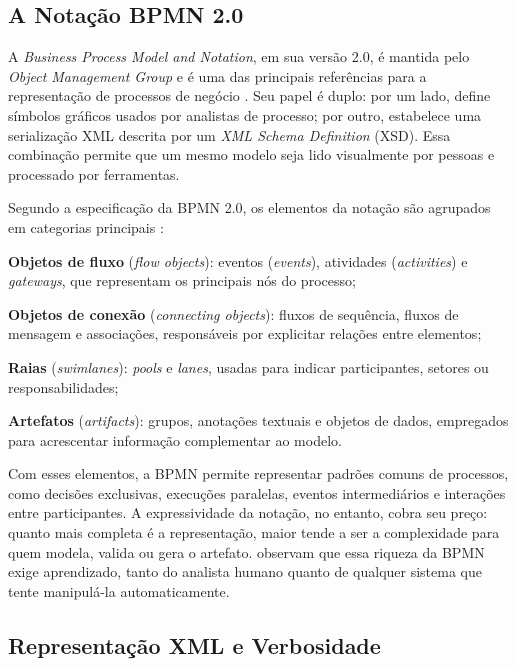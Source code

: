 \subsection{A Notação BPMN 2.0}
\label{subsec:bpmn-notacao}

A \textit{Business Process Model and Notation}, em sua versão 2.0, é mantida pelo \textit{Object Management Group} e é uma das principais referências para a representação de processos de negócio \cite{omg2011bpmn}. Seu papel é duplo: por um lado, define símbolos gráficos usados por analistas de processo; por outro, estabelece uma serialização XML descrita por um \textit{XML Schema Definition} (XSD). Essa combinação permite que um mesmo modelo seja lido visualmente por pessoas e processado por ferramentas.

Segundo a especificação da BPMN 2.0, os elementos da notação são agrupados em categorias principais :

\begin{alineascomponto}
    \item \textbf{Objetos de fluxo} (\textit{flow objects}): eventos (\textit{events}), atividades (\textit{activities}) e \textit{gateways}, que representam os principais nós do processo;
    \item \textbf{Objetos de conexão} (\textit{connecting objects}): fluxos de sequência, fluxos de mensagem e associações, responsáveis por explicitar relações entre elementos;
    \item \textbf{Raias} (\textit{swimlanes}): \textit{pools} e \textit{lanes}, usadas para indicar participantes, setores ou responsabilidades;
    \item \textbf{Artefatos} (\textit{artifacts}): grupos, anotações textuais e objetos de dados, empregados para acrescentar informação complementar ao modelo.
\end{alineascomponto}

Com esses elementos, a BPMN permite representar padrões comuns de processos, como decisões exclusivas, execuções paralelas, eventos intermediários e interações entre participantes. A expressividade da notação, no entanto, cobra seu preço: quanto mais completa é a representação, maior tende a ser a complexidade para quem modela, valida ou gera o artefato.  observam que essa riqueza da BPMN exige aprendizado, tanto do analista humano quanto de qualquer sistema que tente manipulá-la automaticamente.

\subsection{Representação XML e Verbosidade}
\label{subsec:bpmn-xml}

